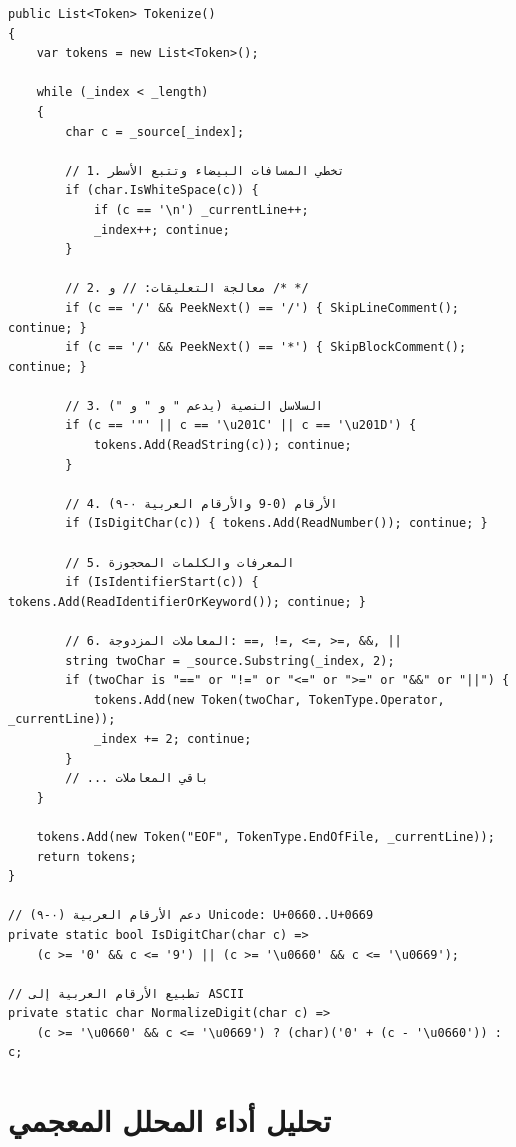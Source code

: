 \documentclass[12pt,a4paper]{report}
\newcommand{\filename}[1]{\textcolor{SecondaryBlue}{\texttt{#1}}}
\begin{document}
\begin{CodeBox}[title={\filename{Lexer.cs} — دورة التحليل الرئيسية}]
\begin{lstlisting}[style=CSharpStyle]
public List<Token> Tokenize()
{
    var tokens = new List<Token>();

    while (_index < _length)
    {
        char c = _source[_index];

        // 1. تخطي المسافات البيضاء وتتبع الأسطر
        if (char.IsWhiteSpace(c)) {
            if (c == '\n') _currentLine++;
            _index++; continue;
        }

        // 2. معالجة التعليقات: // و /* */
        if (c == '/' && PeekNext() == '/') { SkipLineComment(); continue; }
        if (c == '/' && PeekNext() == '*') { SkipBlockComment(); continue; }

        // 3. السلاسل النصية (يدعم " و " و ")
        if (c == '"' || c == '\u201C' || c == '\u201D') {
            tokens.Add(ReadString(c)); continue;
        }

        // 4. الأرقام (0-9 والأرقام العربية ٠-٩)
        if (IsDigitChar(c)) { tokens.Add(ReadNumber()); continue; }

        // 5. المعرفات والكلمات المحجوزة
        if (IsIdentifierStart(c)) { tokens.Add(ReadIdentifierOrKeyword()); continue; }

        // 6. المعاملات المزدوجة: ==, !=, <=, >=, &&, ||
        string twoChar = _source.Substring(_index, 2);
        if (twoChar is "==" or "!=" or "<=" or ">=" or "&&" or "||") {
            tokens.Add(new Token(twoChar, TokenType.Operator, _currentLine));
            _index += 2; continue;
        }
        // ... باقي المعاملات
    }

    tokens.Add(new Token("EOF", TokenType.EndOfFile, _currentLine));
    return tokens;
}

// دعم الأرقام العربية (٠-٩) Unicode: U+0660..U+0669
private static bool IsDigitChar(char c) =>
    (c >= '0' && c <= '9') || (c >= '\u0660' && c <= '\u0669');

// تطبيع الأرقام العربية إلى ASCII
private static char NormalizeDigit(char c) =>
    (c >= '\u0660' && c <= '\u0669') ? (char)('0' + (c - '\u0660')) : c;
\end{lstlisting}
\end{CodeBox}

\section{تحليل أداء المحلل المعجمي}
\end{document}
